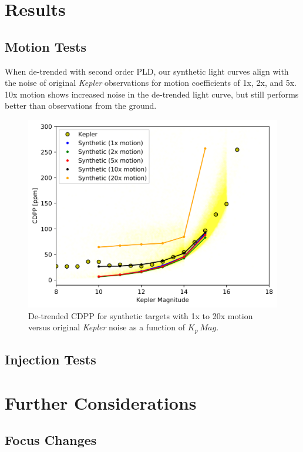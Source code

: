 \documentclass[12pt,preprint]{aastex}
\begin{document}
\section{Results}

\subsection{Motion Tests}

When de-trended with second order PLD, our synthetic light curves align with the noise of original \textit{Kepler} observations for motion coefficients of 1x, 2x, and 5x. 10x motion shows increased noise in the de-trended light curve, but still performs better than observations from the ground.

\begin{figure}[h]
	\centering
	\includegraphics[width=1.0\linewidth]{detmotion.png}
	\caption{De-trended CDPP for synthetic targets with 1x to 20x motion versus original \textit{Kepler} noise as a function of $K_p\ Mag$.}
	\label{fig:detmotion}
\end{figure}

\subsection{Injection Tests}

\section{Further Considerations}

\subsection{Focus Changes}
\end{document}
